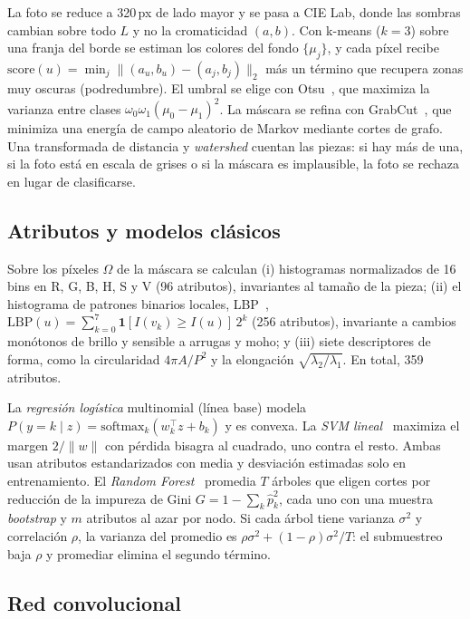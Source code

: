 \documentclass[conference]{IEEEtran}
\begin{document}
La foto se reduce a 320\,px de lado mayor y se pasa a CIE Lab, donde las sombras cambian sobre todo $L$ y no la cromaticidad $(a,b)$. Con k-means ($k=3$) sobre una franja del borde se estiman los colores del fondo $\{\mu_j\}$, y cada píxel recibe $\mathrm{score}(u)=\min_j\lVert(a_u,b_u)-(a_j,b_j)\rVert_2$ más un término que recupera zonas muy oscuras (podredumbre). El umbral se elige con Otsu~\cite{otsu1979}, que maximiza la varianza entre clases $\omega_0\omega_1(\mu_0-\mu_1)^2$. La máscara se refina con GrabCut~\cite{rother2004}, que minimiza una energía de campo aleatorio de Markov mediante cortes de grafo. Una transformada de distancia y \emph{watershed} cuentan las piezas: si hay más de una, si la foto está en escala de grises o si la máscara es implausible, la foto se rechaza en lugar de clasificarse.

\subsection{Atributos y modelos clásicos}

Sobre los píxeles $\Omega$ de la máscara se calculan (i) histogramas normalizados de 16 bins en R, G, B, H, S y V (96 atributos), invariantes al tamaño de la pieza; (ii) el histograma de patrones binarios locales, LBP~\cite{ojala2002}, $\mathrm{LBP}(u)=\sum_{k=0}^{7}\mathbf{1}[I(v_k)\ge I(u)]\,2^k$ (256 atributos), invariante a cambios monótonos de brillo y sensible a arrugas y moho; y (iii) siete descriptores de forma, como la circularidad $4\pi A/P^2$ y la elongación $\sqrt{\lambda_2/\lambda_1}$. En total, 359 atributos.

La \emph{regresión logística} multinomial (línea base) modela $P(y=k\mid z)=\mathrm{softmax}_k(w_k^\top z+b_k)$ y es convexa. La \emph{SVM lineal}~\cite{cortes1995} maximiza el margen $2/\lVert w\rVert$ con pérdida bisagra al cuadrado, uno contra el resto. Ambas usan atributos estandarizados con media y desviación estimadas solo en entrenamiento. El \emph{Random Forest}~\cite{breiman2001} promedia $T$ árboles que eligen cortes por reducción de la impureza de Gini $G=1-\sum_k\hat p_k^2$, cada uno con una muestra \emph{bootstrap} y $m$ atributos al azar por nodo. Si cada árbol tiene varianza $\sigma^2$ y correlación $\rho$, la varianza del promedio es $\rho\sigma^2+(1-\rho)\sigma^2/T$: el submuestreo baja $\rho$ y promediar elimina el segundo término.

\subsection{Red convolucional}
\end{document}
